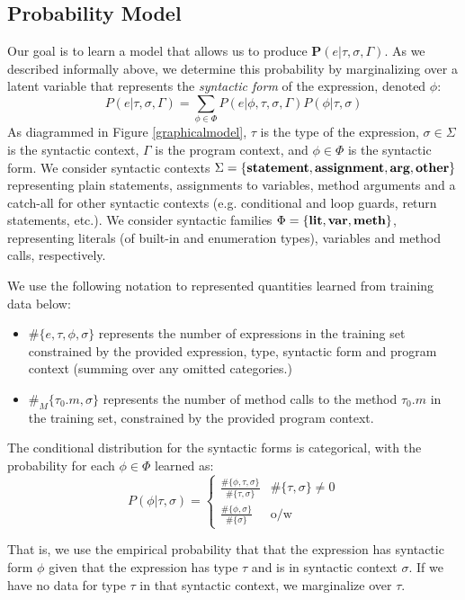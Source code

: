 \documentclass{article} %
\begin{document}
\newcommand{\nm}[1]{\#\{#1\}}
\newcommand{\nmm}[1]{\#_M\{#1\}}

\subsection*{Probability Model}
      Our goal is to learn a model that allows us to produce $\mathbf{P}(e|\tau, \sigma, \Gamma)$. As we described informally above, we determine this probability by marginalizing over a latent variable that represents the \emph{syntactic form} of the expression, denoted $\phi$:
    $$P(e | \tau, \sigma, \Gamma) = \sum_{\phi \in \Phi} P(e | \phi, \tau, \sigma, \Gamma) P(\phi | \tau, \sigma)$$
As diagrammed in Figure \ref{graphicalmodel}, $\tau$ is the type of the expression, $\sigma \in \Sigma$ is the syntactic context, $\Gamma$ is the program context, and $\phi \in \Phi$ is the syntactic form. We consider syntactic contexts $\Sigma = \{\textbf{statement}, \textbf{assignment}, \textbf{arg}, \textbf{other}\}$ representing plain statements, assignments to variables, method arguments and a catch-all for other syntactic contexts (e.g. conditional and loop guards, return statements, etc.). We consider syntactic families $\Phi = \{\textbf{lit}, \textbf{var}, \textbf{meth}\}$, representing literals (of built-in and enumeration types), variables and method calls, respectively. 

	  We use the following notation to represented quantities learned from training data below:
	  \begin{itemize}
	  \item $\nm{e, \tau, \phi, \sigma}$ represents the number of expressions in the training set constrained by the provided expression, type, syntactic form and program context (summing over any omitted categories.)
	  \item $\nmm{\tau_0.m, \sigma}$ represents the number of method calls to the method $\tau_0.m$ in the training set, constrained by the provided program context.
  	  \end{itemize}
  
  The conditional distribution for the syntactic forms is categorical, with the probability for each $\phi \in \Phi$ learned as:
  $$P(\phi | \tau, \sigma) = 
  \left\{
  	\begin{array}{ll}
	 	\frac{\nm{\phi,\tau, \sigma}}{\nm{\tau, \sigma}} & \nm{\tau, \sigma} \neq 0\\
		\frac{\nm{\phi, \sigma}}{\nm{\sigma}} & \mbox{o/w}
	\end{array}
	\right.
  $$
  
  That is, we use the empirical probability that that the expression has syntactic form $\phi$ given that the expression has type $\tau$ and is in syntactic context $\sigma$. If we have no data for type $\tau$ in that syntactic context, we marginalize over $\tau$.
  
\end{document}
